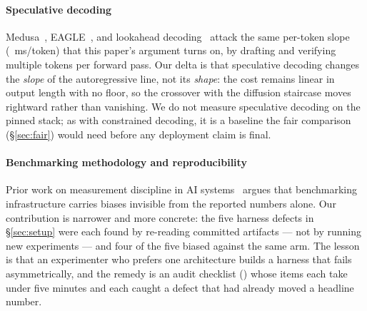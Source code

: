 \paragraph{Speculative decoding}
Medusa~\cite{medusa2024}, EAGLE~\cite{eagle2024}, and lookahead
decoding~\cite{lookahead2024} attack the same per-token slope
(\arSlope~ms/token) that this paper's argument turns on, by drafting and
verifying multiple tokens per forward pass. Our delta is that speculative
decoding changes the \emph{slope} of the autoregressive line, not its
\emph{shape}: the cost remains linear in output length with no floor, so the
crossover with the diffusion staircase moves rightward rather than
vanishing. We do not measure speculative decoding on the pinned stack; as
with constrained decoding, it is a baseline the fair comparison
(\S\ref{sec:fair}) would need before any deployment claim is final.

\paragraph{Benchmarking methodology and reproducibility}
Prior work on measurement discipline in AI systems~\cite{hoefler2021}
argues that benchmarking infrastructure carries biases invisible from the
reported numbers alone. Our contribution is narrower and more concrete: the
five harness defects in \S\ref{sec:setup} were each found by re-reading
committed artifacts --- not by running new experiments --- and four of the
five biased against the same arm. The lesson is that an experimenter who
prefers one architecture builds a harness that fails asymmetrically, and the
remedy is an audit checklist () whose items each take
under five minutes and each caught a defect that had already moved a
headline number.
